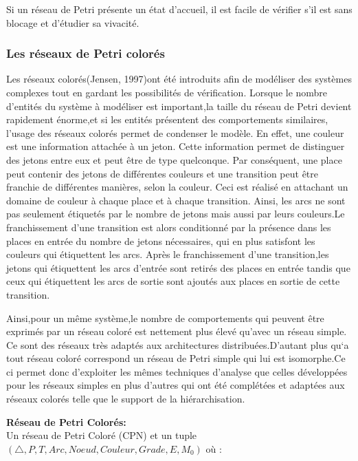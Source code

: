 Si un réseau de Petri présente un état d’accueil, il est facile de vérifier s’il est sans blocage et d'étudier sa vivacité.


\subsubsection{Les réseaux de Petri colorés}
Les réseaux colorés(Jensen, 1997)ont été introduits afin de modéliser des systèmes complexes tout en gardant les possibilités de vérification. Lorsque le nombre d'entités du système à modéliser est important,la taille du réseau de Petri devient rapidement énorme,et si les entités présentent des comportements similaires, l'usage des réseaux colorés permet de condenser le modèle. En effet, une couleur est une information attachée à un jeton. Cette information permet de distinguer des jetons entre eux et peut être de type quelconque. Par conséquent, une place peut contenir des jetons de différentes couleurs et une transition peut être franchie de différentes manières, selon la couleur. Ceci est réalisé en attachant un domaine de couleur à chaque place et à chaque transition. Ainsi, les arcs ne sont pas seulement étiquetés par le nombre de jetons mais aussi par leurs couleurs.Le franchissement d'une transition est alors conditionné par la présence dans les places en entrée du nombre de jetons nécessaires, qui en plus satisfont les couleurs qui étiquettent les arcs. Après le franchissement d'une transition,les jetons qui étiquettent les arcs d'entrée sont retirés des places en entrée tandis que ceux qui étiquettent les arcs de sortie sont ajoutés aux places en sortie de cette transition.

Ainsi,pour un même système,le nombre de comportements qui peuvent être exprimés par un réseau coloré est nettement plus élevé qu’avec un réseau simple. Ce sont des réseaux très adaptés aux architectures distribuées.D'autant plus qu`a tout réseau coloré correspond un réseau de Petri simple qui lui est isomorphe.Ce ci permet donc d'exploiter les mêmes techniques d'analyse que celles développées pour les réseaux simples en plus d'autres qui ont été complétées et adaptées aux réseaux colorés telle que le support de la
 hiérarchisation.

\begin{defn}\textbf{Réseau de Petri Colorés:}\\
	Un réseau de Petri Coloré (CPN) et un tuple $(\bigtriangleup,P,T,Arc,Noeud,Couleur,Grade,E,M_{0}) $ où :
 

\end{defn}


